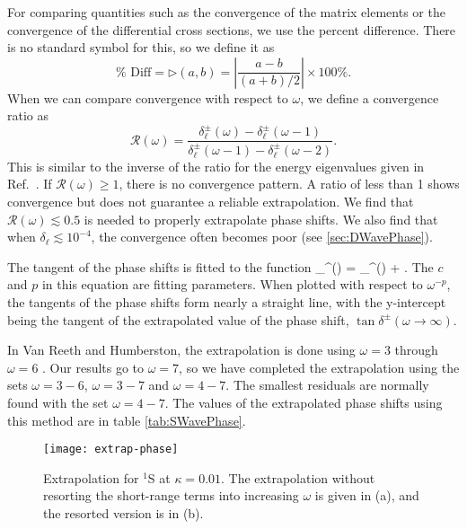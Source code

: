\documentclass[Dissertation.tex]{subfiles}
\begin{document}
For comparing quantities such as the convergence of the matrix elements or 
the convergence of the differential cross sections, we use the percent
difference. There is no standard symbol for this, so we define it as
\begin{equation}
\label{eq:PercentDiff}
\% \text{ Diff} = \rhd(a,b) = \left| \frac{a - b}{(a + b) / 2} \right| \times 100\%.
\end{equation}
When we can compare convergence with respect to $\omega$, we define a
convergence ratio as
\begin{equation}
\label{eq:ConvRatio}
\mathcal{R}(\omega) = \frac{\delta_\ell^\pm(\omega)-\delta_\ell^\pm(\omega-1)}
  {\delta_\ell^\pm(\omega-1)-\delta_\ell^\pm(\omega-2)}.
\end{equation}
This is similar to the inverse of the ratio for the energy eigenvalues given in
Ref.~\cite{Yan1999}. If $\mathcal{R}(\omega) \geq 1$, there is no convergence
pattern. A ratio of less than 1 shows convergence but does not guarantee a
reliable extrapolation. We find that $\mathcal{R}(\omega) \lesssim 0.5$ is
needed to properly extrapolate phase shifts. We also find that when
$\delta_\ell \lesssim 10^{-4}$, the convergence often becomes poor
(see \cref{sec:DWavePhase}).

The tangent of the phase shifts is fitted to the function
\beq
\label{eq:PhaseExtrap}
\tan \delta_\ell^\pm(\omega) = \tan \delta_\ell^\pm(\omega \to \infty) + .
\eeq
The $c$ and $p$ in this equation are fitting parameters. When plotted with respect to $\omega^{-p}$, the tangents of the phase shifts form nearly a straight line, with the y-intercept being the tangent of the extrapolated value of the phase shift, $\tan \delta^\pm(\omega \to \infty)$.

In Van Reeth and Humberston, the extrapolation is done using $\omega = 3$ through $\omega = 6$ \cite{VanReeth2003}. Our results go to $\omega = 7$, so we have completed the extrapolation using the sets $\omega = 3-6$, $\omega = 3-7$ and $\omega = 4-7$. The smallest residuals are normally found with the set $\omega = 4-7$. The values of the extrapolated phase shifts using this method are in table \ref{tab:SWavePhase}.

\begin{figure}
	\centering
	\texttt{[image: extrap-phase]}
	\caption[Extrapolation for $^1$S at $\kappa = 0.01$]{Extrapolation for $^1$S at $\kappa = 0.01$. The extrapolation without resorting the short-range terms into increasing $\omega$ is given in (a), and the resorted version is in (b).}
	\label{fig:extrap-phase}
\end{figure}
\end{document}
